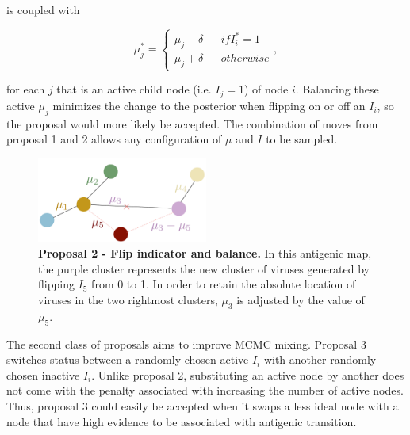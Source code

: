 \documentclass[11pt,oneside,letterpaper]{article}
\begin{document}
is coupled with

\begin{equation}
\label{muBalance-equation}
	\mu_j^{*} =  \left \{
\begin{array}{lllr}
    \mu_j - \delta	&	& if I_i^{*} = 1\\
    \mu_j + \delta	& & otherwise
\end{array}
\right.
,
\end{equation}

for each $j$ that is an active child node (i.e. $I_j = 1$) of node $i$. Balancing these active $\mu_j$ minimizes the change to the posterior when flipping on or off an $I_i$, so the proposal would more likely be accepted. The combination of moves from proposal 1 and 2 allows any configuration of $\mu$ and $I$ to be sampled.



\begin{figure}[h]
	\centering		
	\includegraphics[width=0.5\textwidth]{figures/lineart/flipAndBalance}
	\caption{\textbf{Proposal 2 - Flip indicator and balance.} 
In this antigenic map, the purple cluster represents the new cluster of viruses generated by flipping $I_{5}$ from 0 to 1. In order to retain the absolute location of viruses in the two rightmost clusters,  $\mu_{3}$ is adjusted by the value of $\mu_{5}$.
	} 
	\label{flipAndBalance} 
\end{figure}


The second class of proposals aims to improve MCMC mixing.
Proposal 3 switches status between a randomly chosen active $I_i$ with another randomly chosen inactive $I_i$. 
Unlike proposal 2, substituting an active node by another does not come with the penalty associated with increasing the number of active nodes.
Thus, proposal 3 could easily be accepted when it swaps a less ideal node with a node that have high evidence to be associated with antigenic transition.
\end{document}
